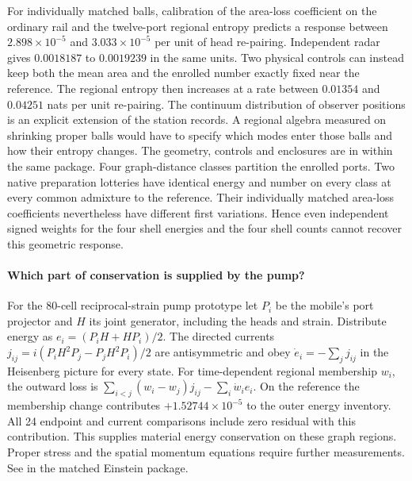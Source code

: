 \documentclass[11pt]{article}
\begin{document}
For individually matched balls, calibration of the area-loss coefficient
on the ordinary rail and the twelve-port regional entropy predicts a
response between $2.898\times10^{-5}$ and $3.033\times10^{-5}$ per unit
of head re-pairing. Independent radar gives $0.0018187$ to $0.0019239$
in the same units. Two physical controls can instead keep both the mean
area and the enrolled number exactly fixed near the reference. The regional
entropy then increases at a rate between $0.01354$ and $0.04251$ nats per
unit re-pairing. The continuum distribution of observer positions is an
explicit extension of the station records. A regional algebra measured
on shrinking proper balls would have to specify which modes enter those
balls and how their entropy changes. The geometry, controls and enclosures
are in  within the same package.
Four graph-distance classes partition the enrolled ports. Two native
preparation lotteries have identical energy and number on every class
at every common admixture to the reference. Their individually matched
area-loss coefficients nevertheless have different first variations.
Hence even independent signed weights for the four shell energies and
the four shell counts cannot recover this geometric response.



\paragraph{Which part of conservation is supplied by the pump?}
For the 80-cell reciprocal-strain pump prototype let $P_i$ be the mobile's port projector
and $H$ its joint generator, including the heads and strain. Distribute
energy as $e_i=(P_iH+HP_i)/2$. The directed currents
$j_{ij}=i(P_iH^2P_j-P_jH^2P_i)/2$ are antisymmetric and obey
$\dot e_i=-\sum_j j_{ij}$ in the Heisenberg picture for every state.
For time-dependent regional membership $w_i$, the outward loss is
$\sum_{i<j}(w_i-w_j)j_{ij}-\sum_i\dot w_i e_i$. On the reference
the membership change contributes $+1.52744\times10^{-5}$ to the outer
energy inventory. All 24 endpoint and current comparisons include zero
residual with this contribution. This supplies material energy
conservation on these graph regions. Proper stress and the spatial
momentum equations require further measurements.
See  in the matched Einstein package.
\end{document}
